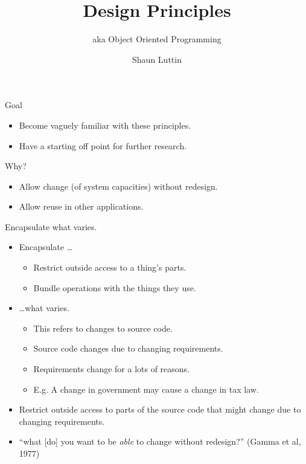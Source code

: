 \documentclass{beamer}
\title{Design Principles}
\subtitle{aka Object Oriented Programming}
\author{Shaun Luttin}
\begin{document}
\begin{frame}
  \titlepage
\end{frame}

\begin{frame}{Goal}

    \begin{itemize}
        \item Become vaguely familiar with these principles.
        \item Have a starting off point for further research.
    \end{itemize}

\end{frame}

\begin{frame}{Why?}

    \begin{itemize}
        \item Allow change (of system capacities) without redesign.
        \item Allow reuse in other applications.
    \end{itemize}

\end{frame}

\begin{frame}{Encapsulate what varies.}
    \begin{itemize}
        \item Encapsulate \ldots
            \begin{itemize}
                \item Restrict outside access to a thing's parts.
                \item Bundle operations with the things they use.
            \end{itemize}
        \item \ldots what varies.
            \begin{itemize}
                \item This refers to changes to source code.
                \item Source code changes due to changing requirements.
                \item Requirements change for a lots of reasons.
                \item E.g. A change in government may cause a change in tax law.
            \end{itemize}
        \item Restrict outside access to parts of the source code that might change due to changing requirements.
        \item ``what [do] you want to be \textit{able} to change without redesign?'' (Gamma et al, 1977)
    \end{itemize}
\end{frame}
\end{document}
